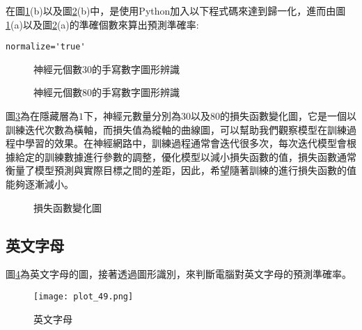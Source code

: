 \documentclass[12pt, a4paper]{article}
\begin{document}
在圖\;\ref{fig:parallel_4}\;(b)以及圖\;\ref{fig:parallel_5}\;(b)中，是使用Python加入以下程式碼來達到歸一化，進而由圖\;\ref{fig:parallel_4}\;(a)以及圖\;\ref{fig:parallel_5}\;(a)的準確個數來算出預測準確率\;:
\begin{lstlisting}
normalize='true'
\end{lstlisting}

\begin{figure}[h]
\centering
{}
\caption{神經元個數\;$30$\;的手寫數字圖形辨識}
\label{fig:parallel_4}
\end{figure}

\begin{figure}[H]
\centering
{}
\caption{神經元個數\;$80$\;的手寫數字圖形辨識}
\label{fig:parallel_5}
\end{figure}

圖\;\ref{fig:parallel_6}\;為在隱藏層為\;$1$\;下，神經元數量分別為\;$30$\;以及\;$80$\;的損失函數變化圖，它是一個以訓練迭代次數為橫軸，而損失值為縱軸的曲線圖，可以幫助我們觀察模型在訓練過程中學習的效果。在神經網路中，訓練過程通常會迭代很多次，每次迭代模型會根據給定的訓練數據進行參數的調整，優化模型以減小損失函數的值，損失函數通常衡量了模型預測與實際目標之間的差距，因此，希望隨著訓練的進行損失函數的值能夠逐漸減小。

\begin{figure}[H]
\centering
{}
\caption{損失函數變化圖}
\label{fig:parallel_6}
\end{figure}

\subsection{英文字母}
圖\;\ref{fig:plot_49.png}\;為英文字母的圖，接著透過圖形識別，來判斷電腦對英文字母的預測準確率。

\begin{figure}[H]
\centering
\texttt{[image: plot\_49.png]}
\caption{英文字母}
\label{fig:plot_49.png}
\end{figure}
\end{document}
